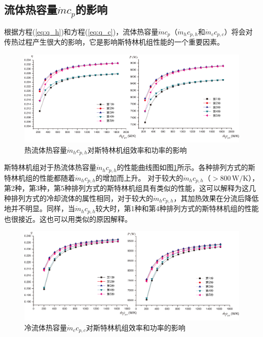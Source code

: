 \subsection{流体热容量$\dot{m}c_p$的影响}

根据方程(\ref{eq:q_h})和方程(\ref{eq:q_c})，流体热容量$\dot{m}c_p$（$\dot{m}_hc_{p,h}$和$\dot{m}_cc_{p,c}$）将会对传热过程产生很大的影响，它是影响斯特林机组性能的一个重要因素。

\noindent \begin{figure}[htbp]
\begin{center}
	\includegraphics[width = 0.95\columnwidth]{fig/qm_hcp_h}
	\caption{热流体热容量$\dot{m}_hc_{p,h}$对斯特林机组效率和功率的影响}
	\label{fig:qm_hcp_h}
\end{center}
\end{figure}

斯特林机组对于热流体热容量$\dot{m}_hc_{p,h}$的性能曲线图如图\ref{fig:qm_hcp_h}所示。各种排列方式的斯特林机组的性能都随着$\dot{m}_hc_{p,h}$的增加而上升。
对于较大的$\dot{m}_hc_{p,h}$（$> 800\,\mathrm{W/K}$），第2种，第3种，第5种排列方式的斯特林机组具有类似的性能，这可以解释为这几种排列方式的冷却流体的属性相同，对于较大的$\dot{m}_hc_{p,h}$，其加热效果在分流后降低地并不明显。同样，当$\dot{m}_hc_{p,h}$较大时，第1种和第4种排列方式的斯特林机组的性能也很接近。这也可以用类似的原因解释。

\noindent \begin{figure}[htbp]
\begin{center}
	\includegraphics[width = 0.95\columnwidth]{fig/qm_ccp_c}
	\caption{冷流体热容量$\dot{m}_cc_{p,c}$对斯特林机组效率和功率的影响}
	\label{fig:qm_ccp_c}
\end{center}
\end{figure}

